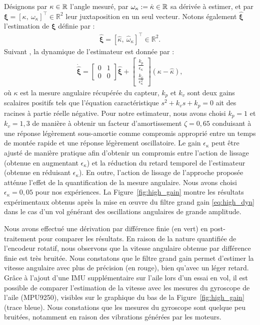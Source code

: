 Désignons par $\kappa \in {\mathbb R}$ l'angle mesuré, par $\omega_{\kappa} := \dot \kappa  \in {\mathbb R}$ sa dérivée à estimer, et par $\boldsymbol{\xi} = [\kappa,~\omega_{\kappa}]^\top \in \mathbb{R}^2$ leur juxtaposition en un seul vecteur. Notons également $\hat{\boldsymbol{\xi}}$ l'estimation de $\boldsymbol{\xi}$ définie par :
\begin{align*}
    \hat{\boldsymbol{\xi}} = [\hat{\kappa},~\hat{\omega}_{\kappa}]^\top \in \mathbb{R}^2.
\end{align*}
Suivant \cite{203613}, la dynamique de l'estimateur est donnée par :
\begin{align}
\label{eq:high_dyn}
    \dot{\hat{\boldsymbol{\xi}}} =  \begin{bmatrix}0 & 1 \\ 0 & 0 \end{bmatrix} \hat{\boldsymbol{\xi}}+ \begin{bmatrix}\frac{k_{p}}{\epsilon_{\kappa}}  \\ \frac{k_{v}}{\epsilon_{\kappa}^{2}}  \end{bmatrix} (\kappa - \hat{\kappa}),
\end{align}
où $\kappa$ est la mesure angulaire récupérée du capteur, $k_{p}$ et $k_{v}$ sont deux gains scalaires positifs tels que l'équation caractéristique $s^{2} + k_{v} s + k_{p} = 0$ ait des racines à partie réelle négative. Pour notre estimateur, nous avons choisi $k_{p} = 1$ et $k_{v} = 1,3$ de manière à obtenir un facteur d'amortissement $\zeta = 0,65$ conduisant à une réponse légèrement sous-amortie comme compromis approprié entre un temps de montée rapide et une réponse légèrement oscillatoire. Le gain $\epsilon_{\kappa}$ peut être ajusté de manière pratique afin d'obtenir un compromis entre l'action de lissage (obtenue en augmentant $\epsilon_{\kappa}$) et la réduction du retard temporel
de l'estimateur (obtenue en réduisant $\epsilon_{\kappa}$). En outre, l'action de lissage de l'approche proposée atténue l'effet de la quantification de la mesure angulaire. Nous avons choisi $\epsilon_{\kappa} = 0,05$ pour nos expériences. La Figure~\ref{fig:high_gain} montre les résultats expérimentaux obtenus après la mise en œuvre du filtre grand gain \eqref{eq:high_dyn} dans le cas d'un vol générant des oscillations angulaires de grande amplitude.

Nous avons effectué une dérivation par différence finie (en vert) en post-traitement pour comparer les résultats. En raison de la nature quantifiée de l'encodeur rotatif, nous observons que la vitesse angulaire obtenue par différence finie est très bruitée. Nous constatons que le filtre grand gain permet d'estimer la vitesse angulaire avec plus de précision (en rouge), bien qu'avec un léger retard. Grâce à l'ajout d'une IMU supplémentaire sur l'aile lors d'un essai en vol, il est possible de comparer l'estimation de la vitesse avec les mesures du gyroscope de l'aile (MPU9250), visibles sur le graphique du bas de la Figure~\ref{fig:high_gain} (trace bleue). Nous constations que les mesures du gyroscope sont quelque peu bruitées, notamment en raison des vibrations générées par les moteurs. 

